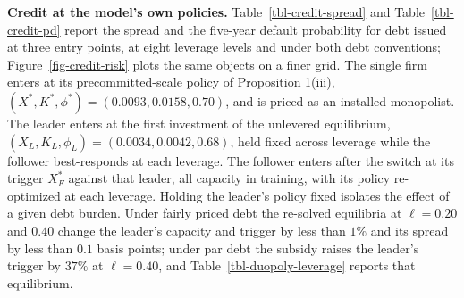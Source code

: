 \documentclass[
  11pt,
  letterpaper,
]{scrartcl}
\begin{document}
\textbf{Credit at the model's own policies.}
Table~\ref{tbl-credit-spread} and Table~\ref{tbl-credit-pd} report the
spread and the five-year default probability for debt issued at three
entry points, at eight leverage levels and under both debt conventions;
Figure~\ref{fig-credit-risk} plots the same objects on a finer grid. The
single firm enters at its precommitted-scale policy of Proposition
1(iii), \((X^*, K^*, \phi^*) = (0.0093, 0.0158, 0.70)\), and is priced
as an installed monopolist. The leader enters at the first investment of
the unlevered equilibrium,
\((X_L, K_L, \phi_L) = (0.0034, 0.0042, 0.68)\), held fixed across
leverage while the follower best-responds at each leverage. The follower
enters after the switch at its trigger \(X_F^*\) against that leader,
all capacity in training, with its policy re-optimized at each leverage.
Holding the leader's policy fixed isolates the effect of a given debt
burden. Under fairly priced debt the re-solved equilibria at
\(\ell = 0.20\) and \(0.40\) change the leader's capacity and trigger by
less than \(1\%\) and its spread by less than \(0.1\) basis points;
under par debt the subsidy raises the leader's trigger by \(37\%\) at
\(\ell = 0.40\), and Table~\ref{tbl-duopoly-leverage} reports that
equilibrium.

\begingroup\setlength{\tabcolsep}{5pt}
\end{document}
